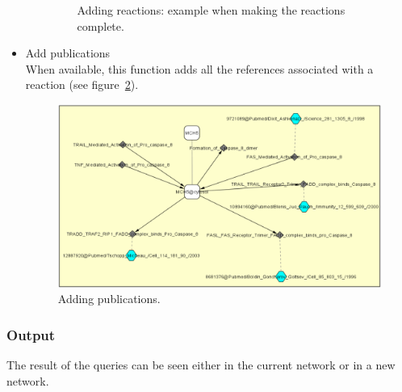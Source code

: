 \begin{itemize}
\begin{itemize}
\begin{figure}[h]
\caption{Adding reactions: example when making the reactions complete.}
\label{Standard_Query_Making_reactions_complete}
\end{figure}
\end{itemize}
\item Add publications\\
When available, this function adds all the references associated with a reaction (see figure~\ref{Standard_Query_Adding_publications}).
\begin{figure}[h]
\centering
\includegraphics[width=18 cm]{graphics/Standard_Query_Adding_publications}
\caption{Adding publications.}
\label{Standard_Query_Adding_publications}
\end{figure}
\end{itemize}
\subsubsection{Output}
The result of the queries can be seen either in the current network or in a new network.

